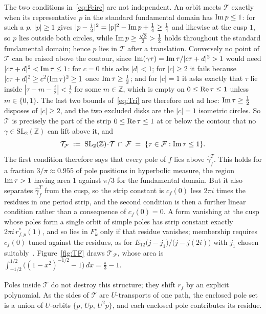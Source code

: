 \documentclass[11pt]{article}
\newcommand{\ZZ}{\mathbb{Z}}
\newcommand{\SLZ}{\mathrm{SL}_2(\ZZ)}
\begin{document}
The two conditions in~\eqref{eq:Fcirc} are not independent. An orbit meets $\mathcal{T}$ exactly
when its representative $p$ in the standard fundamental domain has ${\rm Im}\,p\le1$: for such a
$p$, $|p|\ge1$ gives $|p-\tfrac{i}{2}|^2=|p|^2-{\rm Im}\,p+\tfrac14\ge\tfrac14$ and likewise at the
cusp $1$, so $p$ lies outside both circles, while ${\rm Im}\,p\ge\tfrac{\sqrt3}{2}>\tfrac12$ holds
throughout the standard fundamental domain; hence $p$ lies in $\mathcal{T}$ after a translation.
Conversely no point of $\mathcal{T}$ can be raised above the contour, since
${\rm Im}(\gamma\tau)={\rm Im}\,\tau/|c\tau+d|^{2}>1$ would need $|c\tau+d|^{2}<{\rm Im}\,\tau\le1$:
for $c=0$ this asks $|d|<1$; for $|c|\ge2$ it fails because
$|c\tau+d|^{2}\ge c^{2}({\rm Im}\,\tau)^{2}\ge1$ once ${\rm Im}\,\tau\ge\tfrac12$; and for $|c|=1$ it
asks exactly that $\tau$ lie inside $|\tau-m-\tfrac{i}{2}|<\tfrac12$ for some $m\in\ZZ$, which is
empty on $0\le{\rm Re}\,\tau\le1$ unless $m\in\{0,1\}$. The last two bounds of~\eqref{eq:Tri} are
therefore not ad hoc: ${\rm Im}\,\tau\ge\tfrac12$ disposes of $|c|\ge2$, and the two excluded disks
are the $|c|=1$ isometric circles. So $\mathcal{T}$ is precisely the part of the strip
$0\le{\rm Re}\,\tau\le1$ at or below the contour that no $\gamma\in\SLZ$ can lift above it, and
\begin{equation}\label{eq:foldT}
\mathcal{T}_{\mathcal{F}}\;:=\;\SLZ\!\cdot\!\mathcal{T}\,\cap\,\mathcal{F}
\;=\;\{\tau\in\mathcal{F}:{\rm Im}\,\tau\le1\}.
\end{equation}
The first
condition therefore says that every pole of $f$ lies above $\hat\gamma^T_f$. This holds for a
fraction $3/\pi\approx0.955$ of pole positions in hyperbolic measure, the region
${\rm Im}\,\tau>1$ having area $1$ against $\pi/3$ for the fundamental domain. But it also
separates $\hat\gamma^T_f$ from the cusp, so the strip constant is $c_f(0)$ less $2\pi i$ times the
residues in one period strip, and the second condition is then a further linear condition rather
than a consequence of $c_f(0)=0$. A form vanishing at the cusp whose poles form a single orbit of
simple poles has strip constant exactly $2\pi i\,r^*_{f,p}(1)$, and so lies in $F_k^{\circ}$ only
if that residue vanishes; membership requires $c_f(0)$ tuned against the residues, as for
$E_{12}\big(j-j_1\big)/\big(j-j(2i)\big)$ with $j_1$ chosen
suitably~\cite{VerifyScripts}. Figure~\ref{fig:TF} draws $\mathcal{T}_{\mathcal{F}}$, whose area is
$\int_{-1/2}^{1/2}\big((1-x^2)^{-1/2}-1\big)\,dx=\tfrac{\pi}{3}-1$.

Poles inside $\mathcal{T}$ do not destroy this structure; they shift $r_f$ by an explicit
polynomial. As the sides of $\mathcal{T}$ are $U$-transports of one path, the enclosed pole set
is a union of $U$-orbits $\{p,\,Up,\,U^2p\}$, and each enclosed pole contributes its residue.
\end{document}
